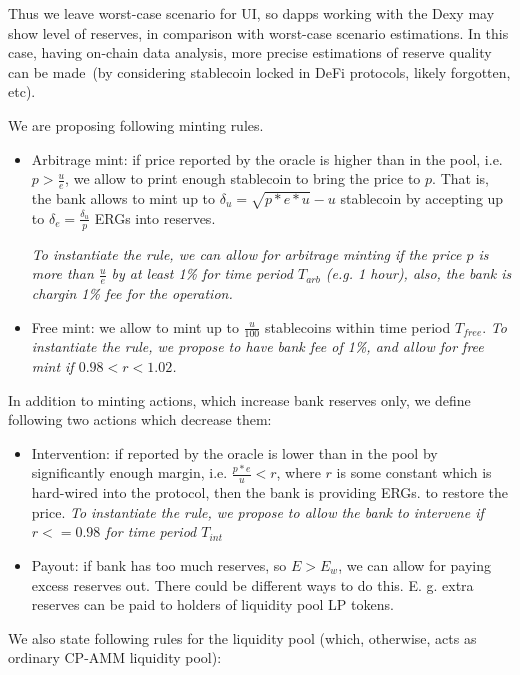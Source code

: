 \documentclass{article}   %
\newcommand{\bc}{ERG}
\newcommand{\sct}{stablecoin}
\newcommand{\dx}{Dexy}
\begin{document}
Thus we leave worst-case scenario for UI, so dapps working with the \dx{} may show level of reserves, in comparison with worst-case scenario estimations. In this case, having on-chain data analysis, 
more precise estimations of reserve quality can be made~(by considering \sct{} locked in DeFi protocols, likely forgotten, etc).

We are proposing following minting rules.  

\begin{itemize}
  \item{Arbitrage mint: } if price reported by the oracle is higher than in the pool, i.e. $p > \frac{u}{e}$, we allow to print enough \sct{} to bring the price to $p$. That is, the bank allows to mint up to $\delta_u = \sqrt{p*e*u}-u$ \sct{} by accepting up to $\delta_e = \frac{\delta_u}{p}$ \bc{}s into reserves. 

  \em{To instantiate the rule, we can allow for arbitrage minting if the price $p$ is more than $\frac{u}{e}$ by at least 1\% for time period $T_{arb}$ (e.g. 1 hour), also, the bank is chargin 1\% fee 
  for the operation.} 

  \item{Free mint: } we allow to mint up to $\frac{u}{100}$ \sct{}s within time period $T_{free}$. 
  \em{To instantiate the rule, we propose to have bank fee of 1\%, and allow for free mint if $0.98 < r < 1.02$}.
\end{itemize}  

In addition to minting actions, which increase bank reserves only, we define following two actions which decrease them: 

\begin{itemize}
   \item{Intervention: } if reported by the oracle is lower than in the pool by significantly enough margin, i.e. $\frac{p*e}{u} < r$, where $r$ is some constant which is hard-wired into the protocol, then the bank is providing \bc{}s. to restore the price.
   \em{To instantiate the rule, we propose to allow the bank to intervene if $r <= 0.98$ for time period $T_{int}$}
   \item{Payout: } if bank has too much reserves, so $E > E_w$, we can allow for paying excess reserves out. There could be different ways to do this. E. g. extra reserves can be paid to holders of
   liquidity pool LP tokens.
\end{itemize}


We also state following rules for the liquidity pool (which, otherwise, acts as ordinary CP-AMM liquidity pool): 
\end{document}
